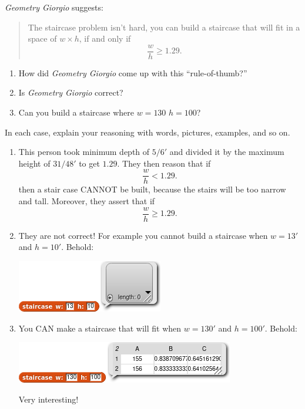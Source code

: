 \documentclass[noauthor,nooutcomes,handout]{../ximera}
\begin{document}
\begin{question}
  \textit{Geometry Giorgio} suggests:
  \begin{quote}
    The staircase problem isn't hard, you can build a staircase that
    will fit in a space of $w\times h$, if and only if
    \[
    \frac{w}{h} \ge 1.29.
    \]
  \end{quote}
  \begin{enumerate}
    \item How did \textit{Geometry Giorgio} come up with this ``rule-of-thumb?''
    \item Is \textit{Geometry Giorgio} correct?
    \item Can you build a staircase where $w=130$ $h=100$? 
  \end{enumerate}
  In each case, explain your reasoning with words, pictures, examples, and so on.
  \begin{freeResponse}
    \begin{enumerate}
    \item This person took minimum depth of $5/6'$ and divided it by
      the maximum height of $31/48'$ to get $1.29$. They then reason that if
      \[
      \frac{w}{h} <1.29.
      \]
      then a stair case CANNOT be built, because the stairs will be
      too narrow and tall. Moreover, they assert that if
      \[
      \frac{w}{h} \ge 1.29.
      \]
    \item They are not correct! For example you cannot build a
      staircase when $w=13'$ and $h=10'$. Behold:
      \begin{center}
        \includegraphics{answer-13-10-result.png}
      \end{center}

    \item You CAN make a staircase that will fit when $w=130'$ and
      $h=100'$. Behold:
      \begin{center}
        \includegraphics{answer-130-100-result.png}
      \end{center}
      Very interesting!
    \end{enumerate}
  \end{freeResponse}
\end{question}
\end{document}
